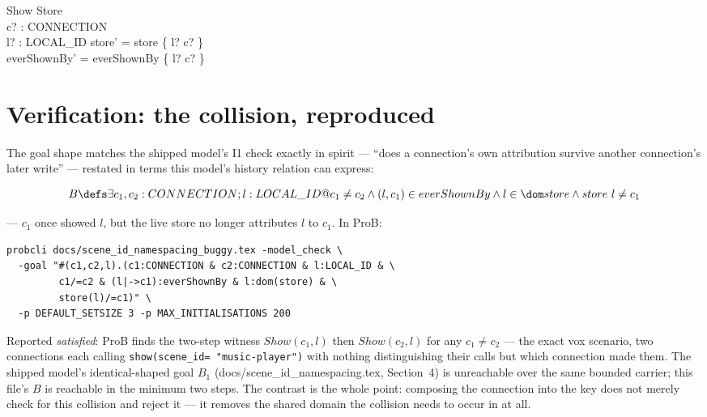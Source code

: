 \documentclass[a4paper,10pt,fleqn]{article}
\begin{document}
\begin{schema}{Show}
  \Delta Store \\
  c? : CONNECTION \\
  l? : LOCAL\_ID
\where
  store' = store \oplus \{ l? \mapsto c? \} \\
  everShownBy' = everShownBy \cup \{ l? \mapsto c? \}
\end{schema}

\section{Verification: the collision, reproduced}

The goal shape matches the shipped model's I1 check exactly in spirit ---
``does a connection's own attribution survive another connection's later
write'' --- restated in terms this model's history relation can express:

\[
  B \defs \exists c_1, c_2 : CONNECTION; l : LOCAL\_ID @
    c_1 \neq c_2 \land (l, c_1) \in everShownBy \land
    l \in \dom store \land store~l \neq c_1
\]

--- $c_1$ once showed $l$, but the live store no longer attributes $l$ to
$c_1$. In ProB:

\begin{verbatim}
probcli docs/scene_id_namespacing_buggy.tex -model_check \
  -goal "#(c1,c2,l).(c1:CONNECTION & c2:CONNECTION & l:LOCAL_ID & \
         c1/=c2 & (l|->c1):everShownBy & l:dom(store) & \
         store(l)/=c1)" \
  -p DEFAULT_SETSIZE 3 -p MAX_INITIALISATIONS 200
\end{verbatim}

Reported \emph{satisfied}: ProB finds the two-step witness
$\mathit{Show}(c_1, l)$ then $\mathit{Show}(c_2, l)$ for any $c_1 \neq c_2$
--- the exact vox scenario, two connections each calling \texttt{show(scene\_id=
"music-player")} with nothing distinguishing their calls but which connection
made them. The shipped model's identical-shaped goal $B_1$
(docs/scene\_id\_namespacing.tex, Section~4) is unreachable over the same
bounded carrier; this file's $B$ is reachable in the minimum two steps. The
contrast is the whole point: composing the connection into the key does not
merely check for this collision and reject it --- it removes the shared
domain the collision needs to occur in at all.
\end{document}
